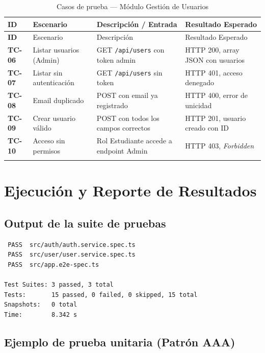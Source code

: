 \documentclass[12pt, letterpaper]{article}
\begin{document}
\begin{longtable}{>{\bfseries\small}p{1.2cm} p{3.2cm} p{4.5cm} p{3.5cm}}
\toprule
\textcolor{lasalleBlue}{ID} &
\textcolor{lasalleBlue}{Escenario} &
\textcolor{lasalleBlue}{Descripción / Entrada} &
\textcolor{lasalleBlue}{Resultado Esperado} \\
\midrule
\endfirsthead
\midrule
ID & Escenario & Descripción & Resultado Esperado \\
\midrule
\endhead
TC-06 & Listar usuarios (Admin) &
  GET \texttt{/api/users} con token admin &
  HTTP 200, array JSON con usuarios \\[4pt]
TC-07 & Listar sin autenticación &
  GET \texttt{/api/users} sin token &
  HTTP 401, acceso denegado \\[4pt]
TC-08 & Email duplicado &
  POST con email ya registrado &
  HTTP 400, error de unicidad \\[4pt]
TC-09 & Crear usuario válido &
  POST con todos los campos correctos &
  HTTP 201, usuario creado con ID \\[4pt]
TC-10 & Acceso sin permisos &
  Rol Estudiante accede a endpoint Admin &
  HTTP 403, \textit{Forbidden} \\
\bottomrule
\caption{Casos de prueba --- Módulo Gestión de Usuarios}
\end{longtable}

\section{Ejecución y Reporte de Resultados}

\subsection{Output de la suite de pruebas}

\begin{infobox}
\begin{verbatim}
 PASS  src/auth/auth.service.spec.ts
 PASS  src/user/user.service.spec.ts
 PASS  src/app.e2e-spec.ts

Test Suites: 3 passed, 3 total
Tests:       15 passed, 0 failed, 0 skipped, 15 total
Snapshots:   0 total
Time:        8.342 s
\end{verbatim}
\end{infobox}

\subsection{Ejemplo de prueba unitaria (Patrón AAA)}
\end{document}
